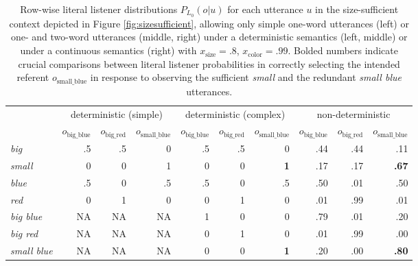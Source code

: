 \documentclass[11pt]{article}
\newcommand{\figref}[1]{Figure \ref{#1}}
\begin{document}
\begin{table}
\caption{Row-wise literal listener distributions $P_{L_0}(o | u)$ for each utterance $u$ in the size-sufficient context depicted in \figref{fig:sizesufficient}, allowing only simple one-word utterances (left) or one- and two-word utterances (middle, right) under a deterministic semantics (left, middle) or under a continuous semantics (right) with  $x_{\text{size}} = .8$, $x_{\text{color}} = .99$. Bolded numbers indicate crucial comparisons between literal listener probabilities in correctly selecting the intended referent $o_{\text{small\_blue}}$ in response to observing the sufficient \emph{small} and the redundant \emph{small blue} utterances.}
\small
\begin{tabular}{l r r r r r r r r r}
\toprule
& \multicolumn{3}{c}{deterministic (simple)} & \multicolumn{3}{c}{deterministic (complex)} & \multicolumn{3}{c}{non-deterministic}\\
& $o_{\textrm{big\_blue}}$ & $o_{\textrm{big\_red}}$ & $o_{\textrm{small\_blue}}$ & $o_{\textrm{big\_blue}}$ & $o_{\textrm{big\_red}}$ & $o_{\textrm{small\_blue}}$
& $o_{\textrm{big\_blue}}$ & $o_{\textrm{big\_red}}$ & $o_{\textrm{small\_blue}}$ \\
\midrule
\emph{big} & .5 & .5 & 0 & .5 & .5 & 0 & .44 & .44 & .11 \\
\emph{small} & 0 & 0 & 1 & 0 & 0 & \textbf{1} & .17 & .17 & \textbf{.67} \\
\emph{blue} & .5 & 0 & .5 & .5 & 0 & .5 & .50 & .01 & .50 \\
\emph{red} & 0 & 1 & 0 & 0 & 1 & 0 & .01 & .99 & .01 \\
\emph{big blue} & NA & NA & NA & 1 & 0 & 0 & .79 & .01 & .20 \\
\emph{big red} & NA & NA & NA & 0 & 1 & 0 & .01 & .99 & .00 \\
\emph{small blue} & NA & NA & NA & 0 & 0 & \textbf{1} & .20 & .00 & \textbf{.80} \\
\bottomrule
\end{tabular}
\label{tab:detliteral}
\end{table}
\end{document}
